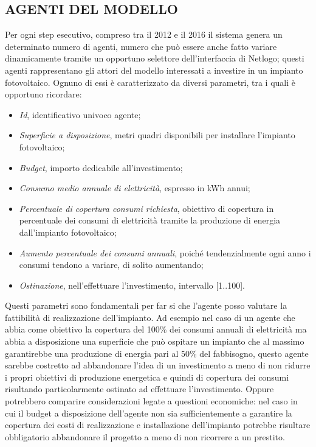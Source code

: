 \documentclass[12pt,a4paper,openright,twoside]{report}
\begin{document}
\subsection{AGENTI DEL MODELLO}
Per ogni step esecutivo, compreso tra il 2012 e il 2016 il sistema genera un determinato numero di agenti, numero che può essere anche fatto variare dinamicamente tramite un opportuno selettore dell'interfaccia di Netlogo; questi agenti rappresentano gli attori del modello interessati a investire in un impianto fotovoltaico. Ognuno di essi è caratterizzato da diversi parametri, tra i quali è opportuno ricordare:
\begin{itemize}
\item \emph{Id}, identificativo univoco agente;
\item \emph{Superficie a disposizione}, metri quadri disponibili per installare l'impianto fotovoltaico;
\item \emph{Budget}, importo dedicabile all'investimento;
\item \emph{Consumo medio annuale di elettricità}, espresso in kWh annui;
\item \emph{Percentuale di copertura consumi richiesta}, obiettivo di copertura in percentuale dei consumi di elettricità tramite la produzione di energia dall'impianto fotovoltaico;
\item \emph{Aumento percentuale dei consumi annuali}, poiché tendenzialmente ogni anno i consumi tendono a variare, di solito aumentando;
\item \emph{Ostinazione}, nell'effettuare l'investimento, intervallo [1..100].
\end{itemize}
Questi parametri sono fondamentali per far si che l'agente posso valutare la fattibilità di realizzazione dell'impianto. Ad esempio nel caso di un agente che abbia come obiettivo la copertura del 100\% dei consumi annuali di elettricità ma abbia a disposizione una superficie che può ospitare un impianto che al massimo garantirebbe una produzione di energia pari al 50\% del fabbisogno, questo agente sarebbe costretto ad abbandonare l'idea di un investimento a meno di non ridurre i propri obiettivi di produzione energetica e quindi di copertura dei consumi risultando particolarmente ostinato ad effettuare l'investimento. Oppure potrebbero comparire considerazioni legate a questioni economiche: nel caso in cui il budget a disposizione dell'agente non sia sufficientemente a garantire la copertura dei costi di realizzazione e installazione dell'impianto potrebbe risultare obbligatorio abbandonare il progetto a meno di non ricorrere a un prestito. 
\end{document}
